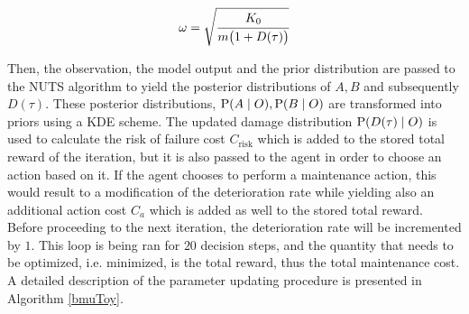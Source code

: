 $$ \omega = \sqrt{\cfrac{K_0}{m\big( 1 + D(\tau)\big)}}$$

Then, the observation, the model output and the prior distribution are passed to the \gls{NUTS} algorithm to yield the posterior distributions of $A, B$ and subsequently $D(\tau)$. These posterior distributions, $\text{P}(A \mid O), \text{P}(B \mid O)$ are transformed into priors using a \gls{KDE} scheme. The updated damage distribution $\text{P}(D(\tau) \mid O)$ is used to calculate the risk of failure cost $C_{\text{risk}}$ which is added to the stored total reward of the iteration, but it is also passed to the agent in order to choose an action based on it. If the agent chooses to perform a maintenance action, this would result to a modification of the deterioration rate while yielding also an additional action cost $C_a$ which is added as well to the stored total reward. Before proceeding to the next iteration, the deterioration rate will be incremented by $1$. This loop is being ran for $20$ decision steps, and the quantity that needs to be optimized, i.e. minimized, is the total reward, thus the total maintenance cost.\\

A detailed description of the parameter updating procedure is presented in Algorithm \ref{bmuToy}.\\



